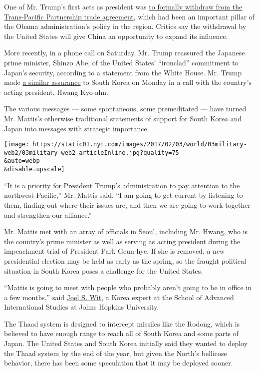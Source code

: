 One of Mr. Trump's first acts as president was
\href{https://www.nytimes.com/2017/01/23/us/politics/tpp-trump-trade-nafta.html}{to
formally withdraw from the Trans-Pacific Partnership trade agreement},
which had been an important pillar of the Obama administration's policy
in the region. Critics say the withdrawal by the United States will give
China an opportunity to expand its influence.

More recently, in a phone call on Saturday, Mr. Trump reassured the
Japanese prime minister, Shinzo Abe, of the United States' ``ironclad''
commitment to Japan's security, according to a statement from the White
House. Mr. Trump made
\href{https://www.nytimes.com/2017/01/30/world/asia/trump-north-korea-south.html}{a
similar assurance} to South Korea on Monday in a call with the country's
acting president, Hwang Kyo-ahn.

The various messages --- some spontaneous, some premeditated --- have
turned Mr. Mattis's otherwise traditional statements of support for
South Korea and Japan into messages with strategic importance.

\texttt{[image: https://static01.nyt.com/images/2017/02/03/world/03military-web2/03military-web2-articleInline.jpg?quality=75\\\&auto=webp\\\&disable=upscale]}

``It is a priority for President Trump's administration to pay attention
to the northwest Pacific,'' Mr. Mattis said. ``I am going to get current
by listening to them, finding out where their issues are, and then we
are going to work together and strengthen our alliance.''

Mr. Mattis met with an array of officials in Seoul, including Mr. Hwang,
who is the country's prime minister as well as serving as acting
president during the impeachment trial of President Park Geun-hye. If
she is removed, a new presidential election may be held as early as the
spring, so the fraught political situation in South Korea poses a
challenge for the United States.

``Mattis is going to meet with people who probably aren't going to be in
office in a few months,'' said
\href{http://uskoreainstitute.org/research/visiting-scholars/joel-wit/}{Joel
S. Wit}, a Korea expert at the School of Advanced International Studies
at Johns Hopkins University.

The Thaad system is designed to intercept missiles like the Rodong,
which is believed to have enough range to reach all of South Korea and
some parts of Japan. The United States and South Korea initially said
they wanted to deploy the Thaad system by the end of the year, but given
the North's bellicose behavior, there has been some speculation that it
may be deployed sooner.

